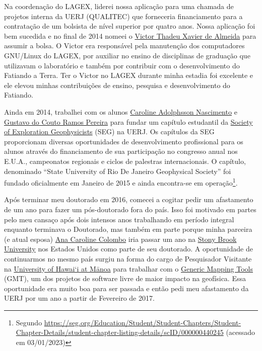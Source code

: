\documentclass[10pt,a4paper,oneside]{book}
\newcommand{\UHM}{University of Hawai`i at M\={a}noa}
\begin{document}
Na coordenação do LAGEX, liderei nossa aplicação para uma chamada de projetos
interna da UERJ (QUALITEC) que forneceria financiamento para a
contratação de um bolsista de nível superior por quatro anos.
Nossa aplicação foi bem sucedida e no final de 2014 nomeei o
\href{https://www.linkedin.com/in/victorxalmeida/}{Victor Thadeu Xavier de Almeida}
para assumir a bolsa.
O Victor era responsável pela manutenção dos computadores GNU/Linux do LAGEX,
por auxiliar no ensino de disciplinas de graduação que utilizavam o
laboratório e também por contribuir com o desenvolvimento do Fatiando a Terra.
Ter o Victor no LAGEX durante minha estadia foi excelente e ele elevou minhas
contribuições de ensino, pesquisa e desenvolvimento do Fatiando.

Ainda em 2014, trabalhei com os alunos
\href{https://www.linkedin.com/in/caroline-adolphsson-61723137/}{Caroline Adolphsson Nascimento}
e \href{https://www.linkedin.com/in/gustavo-pereira-780839111/}{Gustavo do Couto Ramos Pereira}
para fundar um capítulo estudantil da
\href{https://seg.org}{Society of Exploration Geophysicists} (SEG) na UERJ.
Os capítulos da SEG proporcionam diversas oportunidades de desenvolvimento
profissional para os alunos através do financiamento de sua participação no
congresso anual nos E.U.A., campeonatos regionais e ciclos de palestras
internacionais.
O capítulo, denominado ``State University of Rio De Janeiro Geophysical
Society'' foi fundado oficialmente em Janeiro de 2015 e ainda encontra-se em
operação\footnote{Segundo \url{https://seg.org/Education/Student/Student-Chapters/Student-Chapter-Details/student-chapter-listing-details/scID/000000440245} (acessado em 03/01/2023)}.

Após terminar meu doutorado em 2016, comecei a cogitar pedir um afastamento de
um ano para fazer um pós-doutorado fora do país.
Isso foi motivado em partes pelo meu cansaço após dois intensos anos
trabalhando em período integral enquanto terminava o Doutorado, mas também em
parte porque minha parceira (e atual esposa)
\href{https://www.acarolcolombo.com/}{Ana Caroline Colombo} iria passar um ano
na \href{https://www.stonybrook.edu/}{Stony Brook University} nos Estados
Unidos como parte de seu doutorado.
A oportunidade de continuarmos no mesmo país surgiu na forma do cargo de
Pesquisador Visitante na
\href{https://www.hawaii.edu/}{\UHM{}} para trabalhar com o
\href{https://www.generic-mapping-tools.org/}{Generic Mapping Tools} (GMT),
um dos projetos de software livre de maior impacto na geofísica.
Essa oportunidade era muito boa para ser passada e então pedi meu afastamento
da UERJ por um ano a partir de Fevereiro de 2017.
\end{document}
